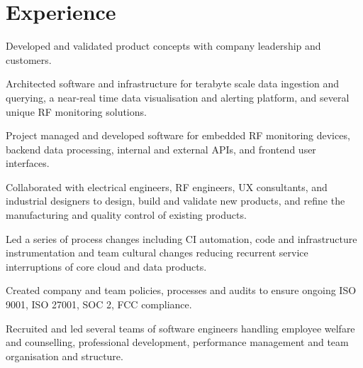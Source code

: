\documentclass[]{tjd-cv}
\begin{document}
\begin{minipage}[t]{0.70\textwidth}


\section{Experience}
\vspace{\topsep}
\begin{tightemize}
\item Developed and validated product concepts with company leadership and customers.
\item Architected software and infrastructure for terabyte scale data ingestion and querying, a near-real time data visualisation and alerting platform, and several unique RF monitoring solutions.
\item Project managed and developed software for embedded RF monitoring devices, backend data processing, internal and external APIs, and frontend user interfaces.
\item Collaborated with electrical engineers, RF engineers, UX consultants, and industrial designers to design, build and validate new products, and refine the manufacturing and quality control of existing products.
\item Led a series of process changes including CI automation, code and infrastructure instrumentation and team cultural changes reducing recurrent service interruptions of core cloud and data products.
\item Created company and team policies, processes and audits to ensure ongoing ISO 9001, ISO 27001, SOC 2, FCC compliance.
\item Recruited and led several teams of software engineers handling employee welfare and counselling, professional development, performance management and team organisation and structure.

\end{tightemize}
\sectionsep


\end{minipage}
\end{document}
